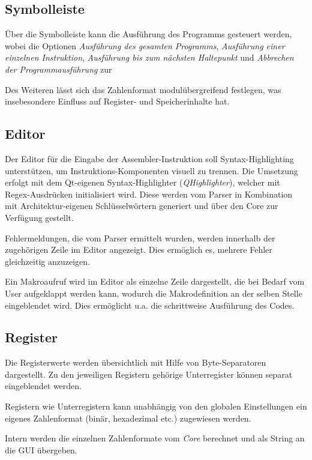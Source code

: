 \subsection{Symbolleiste}

Über die Symbolleiste kann die Ausführung des Programms gesteuert werden, wobei die Optionen \textit{Ausführung des gesamten Programms}, \textit{Ausführung einer einzelnen Instruktion}, \textit{Ausführung bis zum
  nächsten Haltepunkt} und \textit{Abbrechen der Programmausführung} zur

Des Weiteren lässt sich das Zahlenformat modulübergreifend festlegen, was insebesondere Einfluss auf Register- und Speicherinhalte hat.

\subsection{Editor}

Der Editor für die Eingabe der Assembler-Instruktion soll Syntax-Highlighting unterstützen, um Instruktions-Komponenten visuell zu trennen. Die Umsetzung erfolgt mit dem Qt-eigenen Syntax-Highlighter (\textit{QHighlighter}), welcher mit Regex-Ausdrücken initialisiert wird. Diese werden vom Parser in Kombination mit Architektur-eigenen Schlüsselwörtern generiert und über den Core zur Verfügung gestellt.

Fehlermeldungen, die vom Parser ermittelt wurden, werden innerhalb der zugehörigen Zeile im Editor angezeigt. Dies ermöglich es, mehrere Fehler gleichzeitig anzuzeigen.

Ein Makroaufruf wird im Editor als einzelne Zeile dargestellt, die bei Bedarf vom User aufgeklappt werden kann, wodurch die Makrodefinition an der selben Stelle eingeblendet wird. Dies ermöglicht u.a. die schrittweise Ausführung des Codes.

\subsection{Register}

Die Registerwerte werden übersichtlich mit Hilfe von Byte-Separatoren dargestellt. Zu den jeweiligen Registern gehörige Unterregister können separat eingeblendet werden.

Registern wie Unterregistern kann unabhängig von den globalen Einstellungen ein eigenes Zahlenformat (binär, hexadezimal etc.) zugewiesen werden.

Intern werden die einzelnen Zahlenformate vom \textit{Core} berechnet und als String an die GUI übergeben.

